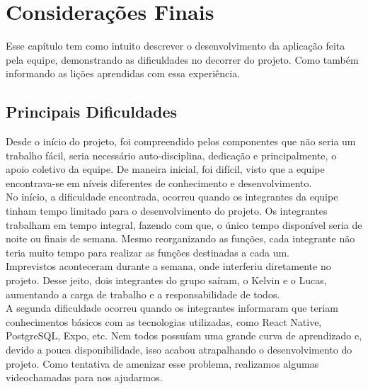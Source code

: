 \chapter{Considerações Finais}

Esse capítulo tem como intuito descrever o desenvolvimento da aplicação feita pela equipe, demonstrando as dificuldades no decorrer do projeto. Como também informando as lições aprendidas com essa experiência.

\section{Principais Dificuldades}
Desde o início do projeto, foi compreendido pelos componentes que não seria um trabalho fácil, seria necessário auto-disciplina, dedicação  e principalmente, o apoio coletivo da equipe. De maneira inicial, foi difícil, visto que a equipe encontrava-se em níveis diferentes de conhecimento e desenvolvimento. \\
 No início, a dificuldade encontrada, ocorreu quando os integrantes da equipe tinham tempo limitado para o desenvolvimento do projeto. Os integrantes trabalham em tempo integral, fazendo com que, o único tempo disponível seria de noite ou finais de semana. Mesmo reorganizando as funções, cada integrante não teria muito tempo para realizar as funções destinadas a cada um. \\
Imprevistos aconteceram durante a semana, onde interferiu diretamente no projeto. Desse jeito, dois integrantes do grupo saíram, o Kelvin e o Lucas, aumentando a carga de trabalho e a responsabilidade de todos.\\
A segunda dificuldade ocorreu quando os integrantes informaram que teriam conhecimentos básicos com as tecnologias utilizadas, como React Native, PostgreSQL, Expo, etc. Nem todos possuíam uma grande curva de aprendizado e, devido a pouca disponibilidade, isso acabou atrapalhando o desenvolvimento do projeto. Como tentativa de amenizar esse problema, realizamos algumas videochamadas para nos ajudarmos.\\


